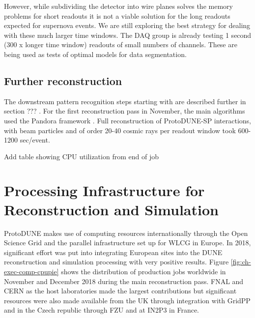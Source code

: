 However,  while subdividing the detector into wire planes solves the memory problems for short readouts it is  not a viable solution for the long readouts expected for supernova events. We are still exploring the best strategy for dealing with these much larger time windows. The DAQ group is already testing 1 second (300 x longer time window) readouts of small numbers of channels.  These are being used as tests of optimal models for data segmentation. 

\subsection{Further reconstruction}
The downstream pattern recognition steps starting with  are described further in section ??? .  For the first reconstruction pass in November, the main algorithms used the Pandora framework \cite{Acciarri:2017hat}.
Full reconstruction of ProtoDUNE-SP interactions, with beam particles and of order 20-40 cosmic rays per readout window took 600-1200 sec/event.



 
  Add table showing CPU utilization from end of job



\section{Processing Infrastructure for Reconstruction and Simulation}
\label{ch-comp-processing}
ProtoDUNE makes use of computing resources internationally through the Open Science Grid and the parallel infrastructure set up for WLCG in Europe.  In 2018, significant effort was put into integrating European sites into the DUNE reconstruction and simulation processing with very positive results.  
Figure \ref{fig:ch-exec-comp-cpupie} shows the distribution of production jobs worldwide in November and December 2018 during the main reconstruction pass.  FNAL and CERN as the host laboratories made the largest contributions but significant resources were also made available from the UK through integration with GridPP and in the Czech republic through FZU and at IN2P3 in France. 

